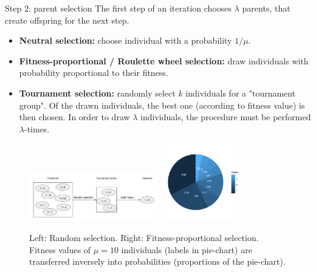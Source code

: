 \documentclass[11pt,compress,t,notes=noshow, xcolor=table]{beamer}
\begin{document}
\begin{vbframe}{Step 2: parent selection}
\footnotesize
The first step of an iteration chooses $\lambda$ parents, that create offspring for the next step.

\begin{itemize}
\item \textbf{Neutral selection: }choose individual with a probability $1/\mu$.
\item \textbf{Fitness-proportional / Roulette wheel selection: }draw individuals with probability proportional to their fitness.
\item \textbf{Tournament selection: }randomly select $k$ individuals for a "tournament group". Of the drawn individuals, the best one (according to fitness value) is then chosen. In order to draw $\lambda$ individuals, the procedure must be performed $\lambda$-times.
\end{itemize}
\vspace*{-0.2cm}
\begin{figure}
  \includegraphics[width=0.5\textwidth]{figure_man/tournament_selection.png} \includegraphics[width=0.3\textwidth]{figure_man/ea_parent_selection.pdf} \\
  \begin{footnotesize}
  Left: Random selection. Right: Fitness-proportional selection. Fitness values of $\mu = 10$ individuals (labels in pie-chart) are transferred inversely into probabilities (proportions of the pie-chart). 
  \end{footnotesize}
\end{figure}
\end{vbframe}
\end{document}
